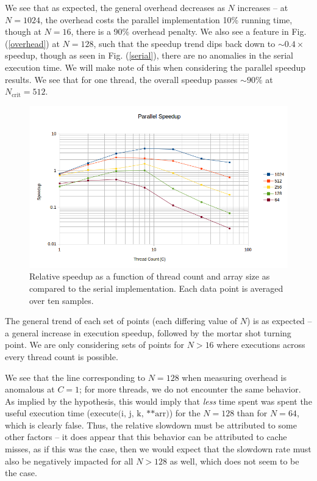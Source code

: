 \documentclass{article}
\newcommand{\figref}[1]{Fig. (\ref{#1})}
\newcommand{\ti}[1]{\emph{#1}}
\newcommand{\cpart}[1]{\newblock{\LARGE {\\\\#1}}}
\newcommand{\code}[1]{\texttt{$\text{#1}$}}
\begin{document}
We see that as expected, the general overhead decreases as $N$ increases -- at $N = 1024$, the overhead costs the parallel implementation 10\% running time, though 
at $N = 16$, there is a 90\% overhead penalty. We also see a feature in \figref{overhead} at $N = 128$, such that the speedup trend dips back down to 
$\sim0.4\times$ speedup, though as seen in \figref{serial}, there are no anomalies in the serial execution time. We will make note of this when considering the 
parallel speedup results. We see that for one thread, the overall speedup passes $\sim90\%$ at $N_\text{crit} = 512$.

\cpart{Parallel Speedup}

\begin{figure}
\begin{center}
	\includegraphics[scale=0.75]{speedup.png}
	\caption{Relative speedup as a function of thread count and array size as compared to the serial implementation. Each data point is averaged over ten samples.}
	\label{speedup}
\end{center}
\end{figure}

The general trend of each set of points (each differing value of $N$) is as expected -- a general increase in execution speedup, followed by the mortar shot turning 
point. We are only considering sets of points for $N > 16$ where executions across every thread count is possible.

We see that the line corresponding to $N = 128$ when measuring overhead is anomalous at $C = 1$; for more threads, we do not encounter the same behavior. As implied 
by the hypothesis, this would imply that \ti{less} time spent was spent the useful execution time (\code{execute(i, j, k, **arr)}) for the $N = 128$ than for $N = 
64$, which is clearly false. Thus, the relative slowdown must be attributed to some other factors -- it does appear that this behavior can be attributed to cache 
misses, as if this was the case, then we would expect that the slowdown rate must also be negatively impacted for all $N > 128$ as well, which does not seem to be 
the case.
\end{document}
